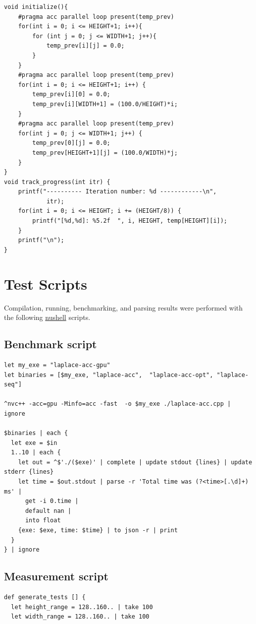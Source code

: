 \documentclass{article}
\begin{document}
\begin{appendices}
\begin{verbatim}
void initialize(){
    #pragma acc parallel loop present(temp_prev)
    for(int i = 0; i <= HEIGHT+1; i++){
        for (int j = 0; j <= WIDTH+1; j++){
            temp_prev[i][j] = 0.0;
        }
    }
    #pragma acc parallel loop present(temp_prev)
    for(int i = 0; i <= HEIGHT+1; i++) {
        temp_prev[i][0] = 0.0;
        temp_prev[i][WIDTH+1] = (100.0/HEIGHT)*i;
    }
    #pragma acc parallel loop present(temp_prev)
    for(int j = 0; j <= WIDTH+1; j++) {
        temp_prev[0][j] = 0.0;
        temp_prev[HEIGHT+1][j] = (100.0/WIDTH)*j;
    }
}
void track_progress(int itr) {
    printf("---------- Iteration number: %d ------------\n",
            itr);
    for(int i = 0; i <= HEIGHT; i += (HEIGHT/8)) {
        printf("[%d,%d]: %5.2f  ", i, HEIGHT, temp[HEIGHT][i]);
    }
    printf("\n");
}
  \end{verbatim}

  \clearpage
  \section{Test Scripts}
  Compilation, running, benchmarking, and parsing results were performed with the following
  \href{https://www.nushell.sh/}{nushell} scripts.

  \subsection{Benchmark script}
  \begin{verbatim}
let my_exe = "laplace-acc-gpu"
let binaries = [$my_exe, "laplace-acc",  "laplace-acc-opt", "laplace-seq"]

^nvc++ -acc=gpu -Minfo=acc -fast  -o $my_exe ./laplace-acc.cpp | ignore

$binaries | each {
  let exe = $in
  1..10 | each {
    let out = ^$'./($exe)' | complete | update stdout {lines} | update stderr {lines}
    let time = $out.stdout | parse -r 'Total time was (?<time>[.\d]+) ms' | 
      get -i 0.time |
      default nan |
      into float
    {exe: $exe, time: $time} | to json -r | print
  }
} | ignore
  \end{verbatim}
  
  \subsection{Measurement script}
\begin{verbatim}
def generate_tests [] {
  let height_range = 128..160.. | take 100
  let width_range = 128..160.. | take 100
  

\end{verbatim}
\end{appendices}
\end{document}
